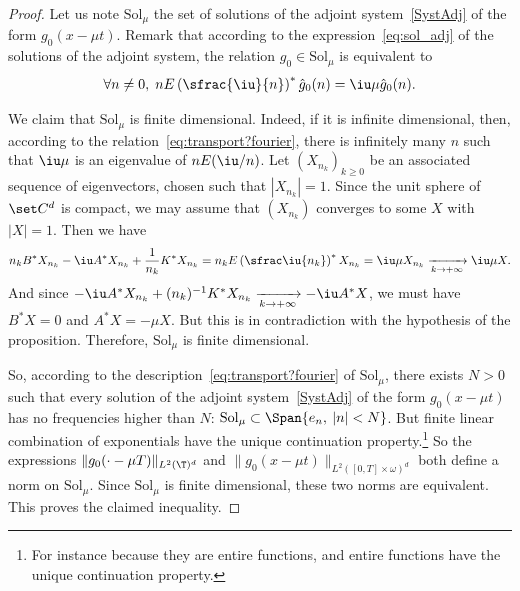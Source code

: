 \newcommand{\Sol}{\mathrm{Sol}}
\begin{proof}
Let us note $\Sol_\mu$ the set of solutions of the adjoint system~\eqref{SystAdj} of the form $g_0(x-\mu t)$.
Remark that according to the expression~\eqref{eq:sol_adj} of the solutions of the adjoint system, the relation $g_0\in\Sol_\mu$ is equivalent to
\begin{equation}\label{eq:transport?fourier}
\forall n\neq 0,\; nE\left(\sfrac{\iu}{n}\right)^*\hat g_0(n) = \iu \mu \hat g_0(n).
\end{equation}

We claim that $\Sol_\mu$ is finite dimensional. Indeed, if it is infinite dimensional, then, according to the relation~\eqref{eq:transport?fourier}, there is infinitely many $n$ such that $\iu \mu$ is an eigenvalue of $nE(\iu/n)$. Let $(X_{n_k})_{k\geq 0}$ be an associated sequence of eigenvectors, chosen such that $|X_{n_k}| = 1$. Since the unit sphere of $\set C^d$ is compact, we may assume that $(X_{n_k})$ converges to some $X$ with $|X|= 1$. Then we have
\[
n_k B^* X_{n_k} -\iu A^* X_{n_k} + \frac1{n_k} K^*X_{n_k} = n_kE\left(\sfrac\iu{n_k} \right)^* X_{n_k} = \iu \mu X_{n_k} \xrightarrow[k\to +\infty]{} \iu \mu X.
\]
And since $-\iu A^* X_{n_k} +(n_k)^{-1} K^*X_{n_k} \xrightarrow[k\to+\infty]{} -\iu A^* X$, we must have $B^*X = 0$ and $A^*X = -\mu X$. But this is in contradiction with the hypothesis of the proposition. Therefore, $\Sol_\mu$ is finite dimensional.

So, according to the description~\eqref{eq:transport?fourier} of $\Sol_\mu$, there exists $N>0$ such that every solution of the adjoint system~\eqref{SystAdj} of the form $g_0(x-\mu t)$ has no frequencies higher than $N$: $\Sol_\mu \subset \Span\{e_n,\:|n|<N\}$. But finite linear combination of exponentials have the unique continuation property.\footnote{For instance because they are entire functions, and entire functions have the unique continuation property.} So the expressions $\|g_0(\cdot - \mu T)\|_{L^2(\T)^d}$ and $\|g_0(x-\mu t)\|_{L^2([0,T]\times \omega)^d}$ both define a norm on $\Sol_\mu$. Since $\Sol_\mu$ is finite dimensional, these two norms are equivalent. This proves the claimed inequality.
\end{proof}

